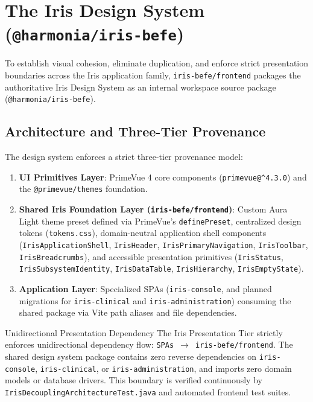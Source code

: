 \section{The Iris Design System (\texttt{@harmonia/iris-befe})}
\label{sec:iris_design_system}

To establish visual cohesion, eliminate duplication, and enforce strict presentation boundaries across the Iris application family, \texttt{iris-befe/frontend} packages the authoritative Iris Design System as an internal workspace source package (\texttt{@harmonia/iris-befe}).

\subsection{Architecture and Three-Tier Provenance}
The design system enforces a strict three-tier provenance model:
\begin{enumerate}
    \item \textbf{UI Primitives Layer}: PrimeVue 4 core components (\texttt{primevue@\string^4.3.0}) and the \texttt{@primevue/themes} foundation.
    \item \textbf{Shared Iris Foundation Layer (\texttt{iris-befe/frontend})}: Custom Aura Light theme preset defined via PrimeVue's \texttt{definePreset}, centralized design tokens (\texttt{tokens.css}), domain-neutral application shell components (\texttt{IrisApplicationShell}, \texttt{IrisHeader}, \texttt{IrisPrimaryNavigation}, \texttt{IrisToolbar}, \texttt{IrisBreadcrumbs}), and accessible presentation primitives (\texttt{IrisStatus}, \texttt{IrisSubsystemIdentity}, \texttt{IrisDataTable}, \texttt{IrisHierarchy}, \texttt{IrisEmptyState}).
    \item \textbf{Application Layer}: Specialized SPAs (\texttt{iris-console}, and planned migrations for \texttt{iris-clinical} and \texttt{iris-administration}) consuming the shared package via Vite path aliases and file dependencies.
\end{enumerate}

\begin{principlebox}{Unidirectional Presentation Dependency}
The Iris Presentation Tier strictly enforces unidirectional dependency flow: \texttt{SPAs $\rightarrow$ iris-befe/frontend}. The shared design system package contains zero reverse dependencies on \texttt{iris-console}, \texttt{iris-clinical}, or \texttt{iris-administration}, and imports zero domain models or database drivers. This boundary is verified continuously by \texttt{IrisDecouplingArchitectureTest.java} and automated frontend test suites.
\end{principlebox}

